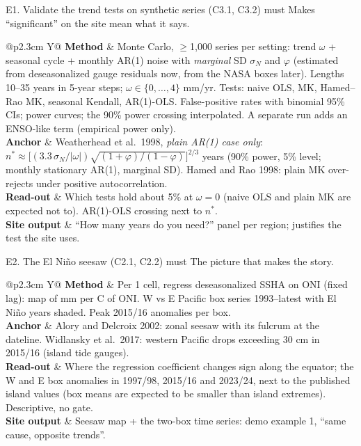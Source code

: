 \documentclass[10pt]{article}
\makeatletter
\newcommand{\row}[2]{\textbf{\sffamily\footnotesize #1} & #2\\}
\newcommand{\card}[1]{\begin{nubox}[]\begin{tabularx}{\linewidth}{@{}p{2.3cm} Y@{}}#1\end{tabularx}\end{nubox}}
\makeatother
\begin{document}
\begin{expbox}{E1. Validate the trend tests on synthetic series (C3.1, C3.2) \hfill must}
Makes ``significant'' on the site mean what it says.
\end{expbox}
\card{
\row{Method}{Monte Carlo, $\geq$1{,}000 series per setting: trend $\omega$ + seasonal cycle + monthly AR(1) noise with \emph{marginal} SD
$\sigma_N$ and $\varphi$ (estimated from deseasonalized gauge residuals now, from the NASA boxes later). Lengths 10--35 years in 5-year steps;
$\omega \in \{0,\ldots,4\}$ mm/yr. Tests: naive OLS, MK, Hamed--Rao MK, seasonal Kendall, AR(1)-OLS. False-positive rates with binomial
95\% CIs; power curves; the 90\% power crossing interpolated. A separate run adds an ENSO-like term (empirical power only).}
\row{Anchor}{Weatherhead et al.\ 1998, \emph{plain AR(1) case only}: $n^* \approx \big[(3.3\,\sigma_N/|\omega|)\sqrt{(1+\varphi)/(1-\varphi)}\big]^{2/3}$
years (90\% power, 5\% level; monthly stationary AR(1), marginal SD). Hamed and Rao 1998: plain MK over-rejects under positive autocorrelation.}
\row{Read-out}{Which tests hold about 5\% at $\omega=0$ (naive OLS and plain MK are expected not to). AR(1)-OLS crossing next to $n^*$.}
\row{Site output}{``How many years do you need?'' panel per region; justifies the test the site uses.}
}

\begin{expbox}{E2. The El Ni\~no seesaw (C2.1, C2.2) \hfill must}
The picture that makes the story.
\end{expbox}
\card{
\row{Method}{Per 1\textdegree{} cell, regress deseasonalized SSHA on ONI (fixed lag): map of mm per \textdegree C of ONI. W vs E Pacific
box series 1993--latest with El Ni\~no years shaded. Peak 2015/16 anomalies per box.}
\row{Anchor}{Alory and Delcroix 2002: zonal seesaw with its fulcrum at the dateline. Widlansky et al.\ 2017: western Pacific drops exceeding
30 cm in 2015/16 (island tide gauges).}
\row{Read-out}{Where the regression coefficient changes sign along the equator; the W and E box anomalies in 1997/98, 2015/16 and 2023/24,
next to the published island values (box means are expected to be smaller than island extremes). Descriptive, no gate.}
\row{Site output}{Seesaw map + the two-box time series: demo example 1, ``same cause, opposite trends''.}
}
\end{document}
